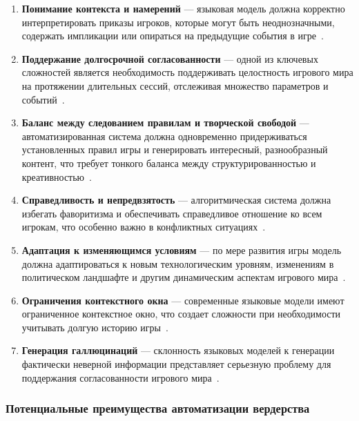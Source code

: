 \begin{enumerate}
    \item \textbf{Понимание контекста и намерений} — языковая модель должна корректно интерпретировать приказы игроков, которые могут быть неоднозначными, содержать импликации или опираться на предыдущие события в игре~\cite{ai-narrative}.

    \item \textbf{Поддержание долгосрочной согласованности} — одной из ключевых сложностей является необходимость поддерживать целостность игрового мира на протяжении длительных сессий, отслеживая множество параметров и событий~\cite{ai-game-simulation}.

    \item \textbf{Баланс между следованием правилам и творческой свободой} — автоматизированная система должна одновременно придерживаться установленных правил игры и генерировать интересный, разнообразный контент, что требует тонкого баланса между структурированностью и креативностью~\cite{ai-narrative}.

    \item \textbf{Справедливость и непредвзятость} — алгоритмическая система должна избегать фаворитизма и обеспечивать справедливое отношение ко всем игрокам, что особенно важно в конфликтных ситуациях~\cite{rpg-gamemaster}.

    \item \textbf{Адаптация к изменяющимся условиям} — по мере развития игры модель должна адаптироваться к новым технологическим уровням, изменениям в политическом ландшафте и другим динамическим аспектам игрового мира~\cite{narratology-games}.

    \item \textbf{Ограничения контекстного окна} — современные языковые модели имеют ограниченное контекстное окно, что создает сложности при необходимости учитывать долгую историю игры~\cite{llm-limitations}.

    \item \textbf{Генерация галлюцинаций} — склонность языковых моделей к генерации фактически неверной информации представляет серьезную проблему для поддержания согласованности игрового мира~\cite{llm-hallucinations}.
\end{enumerate}

\subsubsection{Потенциальные преимущества автоматизации вердерства}

